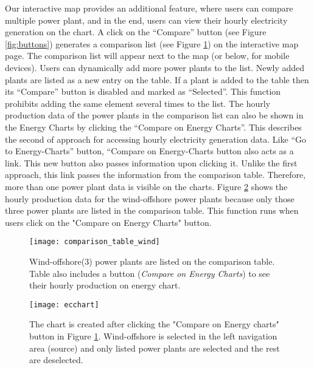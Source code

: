 Our interactive map provides an additional feature, where users can compare multiple power plant, and in the end, users can view their hourly electricity generation on the chart. A click on the “Compare” button (see Figure \ref{fig:buttons}) generates a comparison list (see Figure \ref{fig:ctable}) on the interactive map page. The comparison list will appear next to the map (or below, for mobile devices). Users can dynamically add more power plants to the list. Newly added plants are listed as a new entry on the table. If a plant is added to the table then its “Compare” button is disabled and marked as “Selected”. This function prohibits adding the same element several times to the list. The hourly production data of the power plants in the comparison list can also be shown in the Energy Charts by clicking the “Compare on Energy Charts”. This describes the second of approach for accessing hourly electricity generation data. Like “Go to Energy-Charts” button, “Compare on Energy-Charts button also acts as a link. This new button also passes information upon clicking it. Unlike the first approach, this link passes the information from the comparison table. Therefore, more than one power plant data is visible on the charts. Figure \ref{fig:eccharts} shows the hourly production data for the wind-offshore power plants because only those three power plants are listed in the comparison table. This function runs when users click on the "Compare on Energy Charts" button. 

\begin{figure} [H]
\centering
\texttt{[image: comparison\_table\_wind]}
\caption[Wind-offshore(3) power plants are listed on the comparison table]{Wind-offshore(3) power plants are listed on the comparison table. Table also includes a button (\textit{Compare on Energy Charts}) to see their hourly production on energy chart.}
\label{fig:ctable}
\end{figure}

\begin{figure}
\centering
\texttt{[image: ecchart]}
\caption[Energy Chart showing the hourly production data]{The chart is created after clicking the "Compare on Energy charts" button in Figure \ref{fig:ctable}. Wind-offshore is selected in the left navigation area (source) and only listed power plants are selected and the rest are deselected.}
\label{fig:eccharts}
\end{figure}

